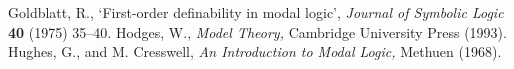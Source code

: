 \documentclass[draft]{article}
\begin{document}
\begin{thebibliography}{}
%
%
%
%
%
%
{\sc Goldblatt,} R.,
`First-order definability in modal logic',
\emph{Journal of Symbolic Logic}\/ {\bf 40} (1975) 35--40.
%
%
%
%
%
%
%
%
%
%
%
%
%
%
{\sc Hodges,} W.,
\emph{Model Theory,}\/
Cambridge University Press (1993).
%
%
%
%
{\sc Hughes,} G., and M. {\sc Cresswell,}
\emph{An Introduction to Modal Logic,}\/
Methuen (1968).
%
%
%
%
%
%

\end{thebibliography}
\end{document}
